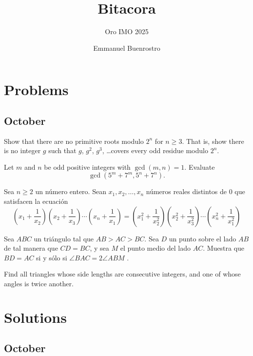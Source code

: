 \documentclass[11pt]{scrartcl}
\title {Bitacora}
\subtitle{Oro IMO 2025}
\author{Emmanuel Buenrostro}
\begin{document}
\maketitle
\tableofcontents

\section{Problems}

\subsection{October}
    \begin{problem} 
            Show that there are no primitive roots modulo $2^n$ for $n \ge 3$.
            That is, show there is no integer $g$ such that
            $g$, $g^2$, $g^3$, \dots covers every odd residue modulo $2^n$.
    \end{problem}
    \begin{problem} [Japan 1996/2]
	  Let $m$ and $n$ be odd positive integers with $\gcd(m,n)=1$.
  Evaluate \[ \gcd(5^m+7^m, 5^n+7^n). \]
    \end{problem}
\begin{problem} [OMM 2020/6] 
Sea $n\geq 2$ un número entero. Sean $x_1,x_2,\ldots, x_n$ números reales distintos de 0 que satisfacen la ecuación 
$$\left(x_1+\frac{1}{x_2}\right)\left(x_2+\frac{1}{x_3}\right)\cdots \left(x_n+\frac{1}{x_1}\right)=\left(x_1^2+\frac{1}{x_2^2}\right)\left(x_2^2+\frac{1}{x_3^2}\right)\cdots \left(x_n^2+\frac{1}{x_1^2}\right)$$
\end{problem}
	\begin{problem} [OMM 2007/6]

    Sea $ABC$ un triángulo tal que $AB > AC > BC$. Sea $D$ un punto sobre el lado $AB$ de tal
manera que $CD = BC$, y sea $M$ el punto medio del lado $AC$. Muestra que $BD = AC$ si
y sólo si $\angle BAC = 2\angle ABM$ .
    \end{problem}
	\begin{problem} [IMO 1968/1]
	Find all triangles whose side lengths are consecutive integers, and one of whose angles is twice another.
	\end{problem}
\section{Solutions}
    \subsection{October}
\end{document}
